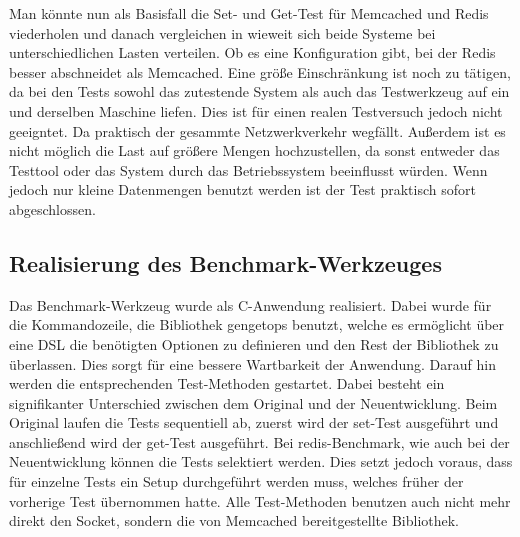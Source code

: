 \begin{minipage}{\linewidth}

\end{minipage}

\begin{minipage}{\linewidth}

\end{minipage}

\begin{minipage}{\linewidth}

\end{minipage}

Man könnte nun als Basisfall die Set- und Get-Test für Memcached und Redis
viederholen und danach vergleichen in wieweit sich beide Systeme bei
unterschiedlichen Lasten verteilen. Ob es eine Konfiguration gibt, bei der Redis
besser abschneidet als Memcached. Eine größe Einschränkung ist noch zu tätigen,
da bei den Tests sowohl das zutestende System als auch das Testwerkzeug auf ein
und derselben Maschine liefen. Dies ist für einen realen Testversuch jedoch nicht
geeigntet. Da praktisch der gesammte Netzwerkverkehr wegfällt. Außerdem ist es
nicht möglich die Last auf größere Mengen hochzustellen, da sonst entweder
das Testtool oder das System durch das Betriebssystem beeinflusst würden. Wenn
jedoch nur kleine Datenmengen benutzt werden ist der Test praktisch sofort
abgeschlossen.

\subsection{Realisierung des Benchmark-Werkzeuges}
Das Benchmark-Werkzeug wurde als C-Anwendung realisiert. Dabei wurde für die
Kommandozeile, die Bibliothek gengetops benutzt, welche es ermöglicht über eine
DSL die benötigten Optionen zu definieren und den Rest der Bibliothek zu
überlassen. Dies sorgt für eine bessere Wartbarkeit der Anwendung. Darauf hin
werden die entsprechenden Test-Methoden gestartet. Dabei besteht ein
signifikanter Unterschied zwischen dem Original und der Neuentwicklung. Beim
Original laufen die Tests sequentiell ab, zuerst wird der set-Test ausgeführt
und anschließend wird der get-Test ausgeführt. Bei redis-Benchmark, wie auch
bei der Neuentwicklung können die Tests selektiert werden. Dies setzt jedoch
voraus, dass für einzelne Tests ein Setup durchgeführt werden muss, welches
früher der vorherige Test übernommen hatte. Alle Test-Methoden benutzen auch
nicht mehr direkt den Socket, sondern die von Memcached bereitgestellte
Bibliothek.

